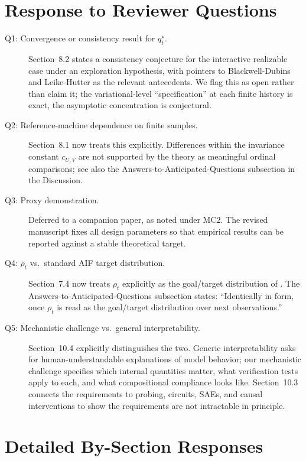 \documentclass[11pt]{article}
\begin{document}
\section*{Response to Reviewer Questions}

\begin{description}
\item[Q1: Convergence or consistency result for $q_t^\star$.] Section~8.2 states a consistency conjecture for the interactive realizable case under an exploration hypothesis, with pointers to Blackwell-Dubins and Leike-Hutter as the relevant antecedents. We flag this as open rather than claim it; the variational-level ``specification'' at each finite history is exact, the asymptotic concentration is conjectural.
\item[Q2: Reference-machine dependence on finite samples.] Section~8.1 now treats this explicitly. Differences within the invariance constant $c_{U,V}$ are not supported by the theory as meaningful ordinal comparisons; see also the Answers-to-Anticipated-Questions subsection in the Discussion.
\item[Q3: Proxy demonstration.] Deferred to a companion paper, as noted under MC2. The revised manuscript fixes all design parameters so that empirical results can be reported against a stable theoretical target.
\item[Q4: $\rho_t$ vs.\ standard AIF target distribution.] Section~7.4 now treats $\rho_t$ explicitly as the goal/target distribution of \citet{ParrFriston2019}. The Answers-to-Anticipated-Questions subsection states: ``Identically in form, once $\rho_t$ is read as the goal/target distribution over next observations.''
\item[Q5: Mechanistic challenge vs.\ general interpretability.] Section~10.4 explicitly distinguishes the two. Generic interpretability asks for human-understandable explanations of model behavior; our mechanistic challenge specifies which internal quantities matter, what verification tests apply to each, and what compositional compliance looks like. Section~10.3 connects the requirements to probing, circuits, SAEs, and causal interventions to show the requirements are not intractable in principle.
\end{description}

\section*{Detailed By-Section Responses}
\end{document}
